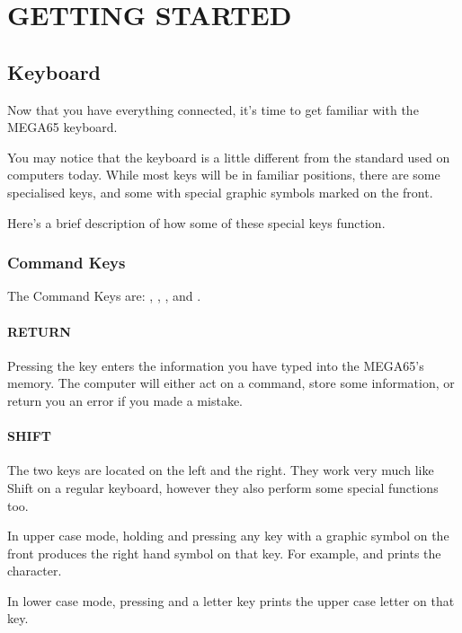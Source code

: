 \chapter{GETTING STARTED}
\section{Keyboard}

Now that you have everything connected, it's time to get familiar with the MEGA65 keyboard.

You may notice that the keyboard is a little different from the standard used on computers today. While most keys will be in familiar positions, there are some specialised keys, and some with special graphic symbols marked on the front.

Here's a brief description of how some of these special keys function.

\subsection{Command Keys}

The Command Keys are: , , , \megasymbolkey and .

\subsubsection{RETURN}

Pressing the  key enters the information you have typed into the MEGA65's memory. The computer will either act on a command, store some information, or return you an error if you made a mistake.

\subsubsection{SHIFT}

The two  keys are located on the left and the right. They work very much like Shift on a regular keyboard, however they also perform some special functions too.

In upper case mode, holding  and pressing any key with a graphic symbol on the front produces the right hand symbol on that key. For example,  and  prints the character.

In lower case mode, pressing  and a letter key prints the upper case letter on that key.

